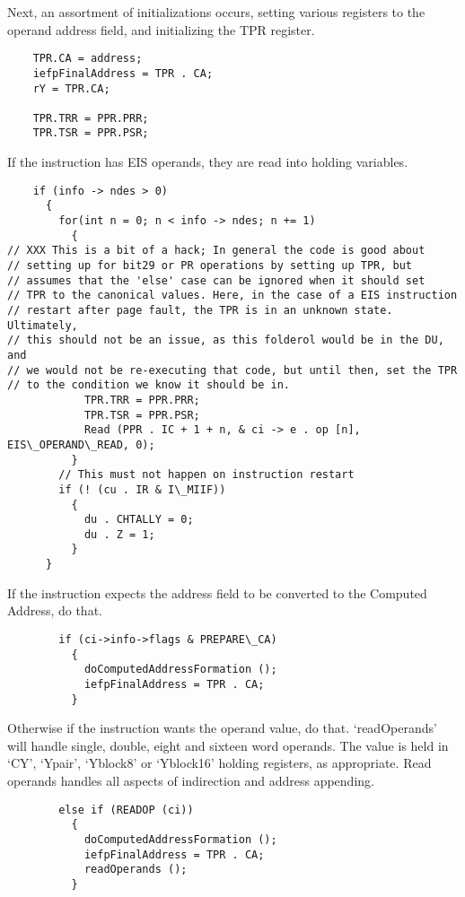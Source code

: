\documentclass[notitlepage]{report}
\begin{document}
Next, an assortment of initializations occurs, setting various registers
to the operand address field, and initializing the TPR register.

\begin{verbatim}
    TPR.CA = address;
    iefpFinalAddress = TPR . CA;
    rY = TPR.CA;

    TPR.TRR = PPR.PRR;
    TPR.TSR = PPR.PSR;
\end{verbatim}

If the instruction has EIS operands, they are read into holding variables.

\begin{verbatim}
    if (info -> ndes > 0)
      {
        for(int n = 0; n < info -> ndes; n += 1)
          {
// XXX This is a bit of a hack; In general the code is good about 
// setting up for bit29 or PR operations by setting up TPR, but
// assumes that the 'else' case can be ignored when it should set
// TPR to the canonical values. Here, in the case of a EIS instruction
// restart after page fault, the TPR is in an unknown state. Ultimately,
// this should not be an issue, as this folderol would be in the DU, and
// we would not be re-executing that code, but until then, set the TPR
// to the condition we know it should be in.
            TPR.TRR = PPR.PRR;
            TPR.TSR = PPR.PSR;
            Read (PPR . IC + 1 + n, & ci -> e . op [n], EIS\_OPERAND\_READ, 0);
          }
        // This must not happen on instruction restart
        if (! (cu . IR & I\_MIIF))
          {
            du . CHTALLY = 0;
            du . Z = 1;
          }
      }
\end{verbatim}

If the instruction expects the address field to be converted to the
Computed Address, do that.

\begin{verbatim}
        if (ci->info->flags & PREPARE\_CA)
          {
            doComputedAddressFormation ();
            iefpFinalAddress = TPR . CA;
          }
\end{verbatim}

Otherwise if the instruction wants the operand value, do that. `readOperands' will handle single, double, eight and sixteen word operands. The value is held in `CY', `Ypair', `Yblock8' or `Yblock16' holding registers, as appropriate. Read operands handles all aspects of indirection and address appending.

\begin{verbatim}
        else if (READOP (ci))
          {
            doComputedAddressFormation ();
            iefpFinalAddress = TPR . CA;
            readOperands ();
          }
\end{verbatim}
\end{document}
